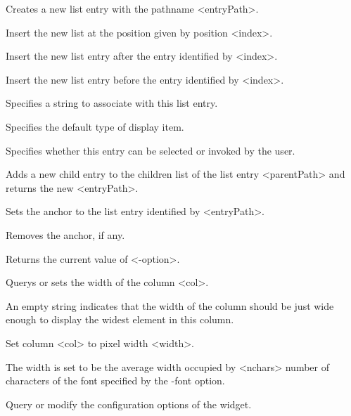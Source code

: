 \vskip5pt

\begin{enum}{1cm}

Creates a new list entry with the pathname <entryPath>.

Insert the new list at the position given by position <index>.

Insert the new list entry after the entry identified by <index>.

Insert the new list entry before the entry identified by <index>.

Specifies a string to associate with this list entry.

Specifies the default type of display item.

Specifies whether this entry can be selected or invoked by the user.

Adds a new child entry to the children list of the list entry <parentPath> and returns the
new <entryPath>.

Sets the anchor to the list entry identified by <entryPath>.

Removes the anchor, if any.

Returns the current value of <-option>.

Querys or sets the width of the column <col>.

An empty string indicates that the width of the column should be just wide enough to display the widest element in this column.

Set column <col> to pixel width <width>.

The width is set to be the average width occupied by <nchars> number of characters of the font specified by the -font option.

Query or modify the configuration options of the widget.


\end{enum}
